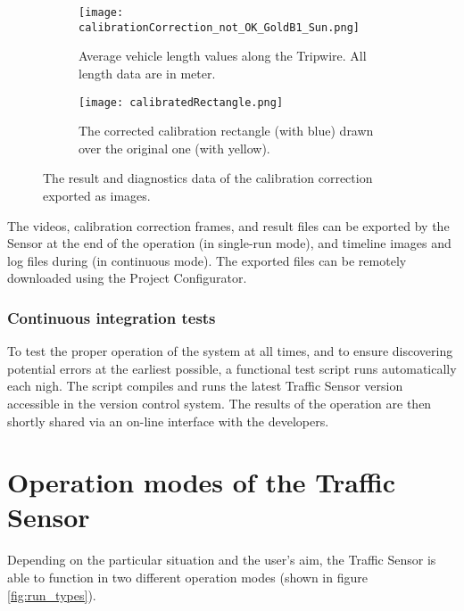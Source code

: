 \begin{figure}[!h]
	\centering
	\begin{subfigure}[b]{0.4\textwidth}
		\texttt{[image: calibrationCorrection\_not\_OK\_GoldB1\_Sun.png]}
		\caption[Visualization of sverage vehicle lengths along the Tripwire]{Average vehicle length values along the Tripwire. All length data are in meter.}
	\end{subfigure}
	\quad
	\begin{subfigure}[b]{0.4\textwidth}
		\texttt{[image: calibratedRectangle.png]}
		\caption{The corrected calibration rectangle (with blue) drawn over the original one (with yellow).}
	\end{subfigure}
	\caption{The result and diagnostics data of the calibration correction exported as images.\label{fig:cal_corr_example}}
\end{figure}

The videos, calibration correction frames, and result files can be exported by the Sensor at the end of the operation (in single-run mode), and timeline images and log files during (in continuous mode).
The exported files can be remotely downloaded using the Project Configurator.

\subsubsection{Continuous integration tests}\label{sec:continuous_integration}
To test the proper operation of the system at all times, and to ensure discovering potential errors at the earliest possible, a functional test script runs automatically each nigh.
The script compiles and runs the latest Traffic Sensor version accessible in the version control system.
The results of the operation are then shortly shared via an on-line interface with the developers.
\section{Operation modes of the Traffic Sensor}\label{chap:operation_modes}
Depending on the particular situation and the user's aim, the Traffic Sensor is able to function in two different operation modes (shown in figure \ref{fig:run_types}).
